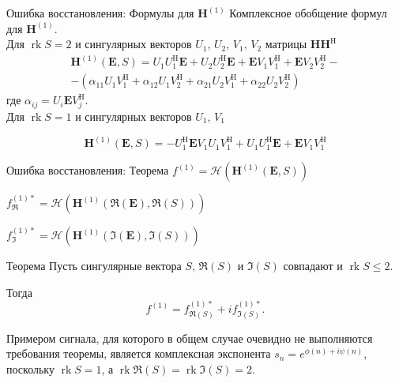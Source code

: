 \documentclass[ucs, notheorems, handout]{beamer}
\DeclareMathOperator{\rk}{rk}
\begin{document}
\begin{frame}{Ошибка восстановления: Формулы для $\mathbf{H}^{(1)}$}
Комплексное обобщение формул для $\mathbf{H}^{(1)}$.\\
\vspace{1em}
Для $\rk S = 2$ и сингулярных векторов $U_1$, $U_2$, $V_1$, $V_2$ матрицы $\mathbf{H} \mathbf{H}^{\mathrm{H}}$
    \begin{multline*}
\mathbf{H}^{(1)}(\mathbf{E}, S) = U_1 U^{\mathrm{H}}_1 \mathbf{E} + U_2 U^{\mathrm{H}}_2 \mathbf{E} + \mathbf{E} V_1 V^{\mathrm{H}}_1 + \mathbf{E} V_2 V^{\mathrm{H}}_2 -
 \\
 -(\alpha_{11} U_1 V^{\mathrm{H}}_1 + \alpha_{12} U_1 V^{\mathrm{H}}_2 + \alpha_{21} U_2 V^{\mathrm{H}}_1 + \alpha_{22} U_2 V^{\mathrm{H}}_2)
\end{multline*}
где $\alpha_{ij} = U_i \mathbf{E} V^{\mathrm{H}}_j$.\\
\vspace{1em}
Для $\rk S = 1$ и сингулярных векторов $U_1$, $V_1$ 

\begin{equation*}
	\mathbf{H}^{(1)}(\mathbf{E}, S) = -U_1^{\mathrm{H}} \mathbf{E} V_1 U_1 V^{\mathrm{H}}_1 + U_1 U^{\mathrm{H}}_1 \mathbf{E} + \mathbf{E} V_1 V^{\mathrm{H}}_1
\end{equation*}
\end{frame}

\begin{frame}{Ошибка восстановления: Теорема}
    $f^{(1)} = \mathcal{H}(\mathbf{H}^{(1)}(\mathbf{E}, S))$

    $f^{(1)*}_{\Re} = \mathcal{H}(\mathbf{H}^{(1)}(\mathbf{\Re(E)}, \Re(S)))$ 

    $f^{(1)*}_{\Im} = \mathcal{H}(\mathbf{H}^{(1)}(\mathbf{\Im(E)}, \Im(S)))$
    
    \begin{block}{Теорема \label{th:sum}}
        Пусть сингулярные вектора $S$, $\Re(S)$ и $\Im(S)$ совпадают и $\rk S \leq 2$.
	
	Тогда $$f^{(1)} = f^{(1)*}_{\Re(S)} + if^{(1)*}_{\Im(S)}.$$
    \end{block}
    
	Примером сигнала, для которого в общем случае очевидно не выполняются требования теоремы, является комплексная экспонента $s_n = e^{\phi(n) + i\psi(n)}$, поскольку $\rk S = 1$, а $\rk\Re(S) = \rk\Im(S) = 2$.

\end{frame}
\end{document}
